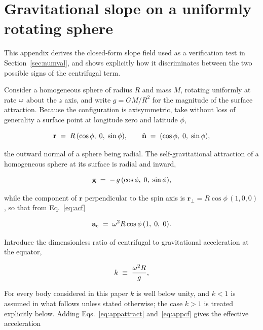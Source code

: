\section{Gravitational slope on a uniformly rotating sphere}
\label{app:rotsphere}

This appendix derives the closed-form slope field used as a verification test in
Section~\ref{sec:numval}, and shows explicitly how it discriminates between the
two possible signs of the centrifugal term.

Consider a homogeneous sphere of radius $R$ and mass $M$, rotating uniformly at
rate $\omega$ about the $z$ axis, and write $g = GM/R^{2}$ for the magnitude
of the surface attraction. Because the configuration is axisymmetric, take
without loss of generality a surface point at longitude zero and latitude
$\phi$,

\begin{equation}
\mathbf{r} \;=\; R\,(\cos\phi,\;0,\;\sin\phi),
\qquad
\hat{\mathbf{n}} \;=\; (\cos\phi,\;0,\;\sin\phi),
\label{eq:apppoint}
\end{equation}

the outward normal of a sphere being radial. The self-gravitational attraction
of a homogeneous sphere at its surface is radial and inward,

\begin{equation}
\mathbf{g} \;=\; -\,g\,(\cos\phi,\;0,\;\sin\phi),
\label{eq:appattract}
\end{equation}

while the component of $\mathbf{r}$ perpendicular to the spin axis is
$\mathbf{r}_{\perp} = R\cos\phi\,(1,0,0)$, so that from Eq.~\eqref{eq:acf}

\begin{equation}
\mathbf{a}_{\mathrm{c}} \;=\; \omega^{2} R\cos\phi\,(1,\;0,\;0).
\label{eq:appcf}
\end{equation}

Introduce the dimensionless ratio of centrifugal to gravitational acceleration
at the equator,

\begin{equation}
k \;\equiv\; \frac{\omega^{2}R}{g},
\label{eq:appk}
\end{equation}

For every body considered in this paper $k$ is well below unity, and $k<1$ is
assumed in what follows unless stated otherwise; the case $k>1$ is treated
explicitly below. Adding Eqs.~\eqref{eq:appattract} and~\eqref{eq:appcf} gives
the effective acceleration


